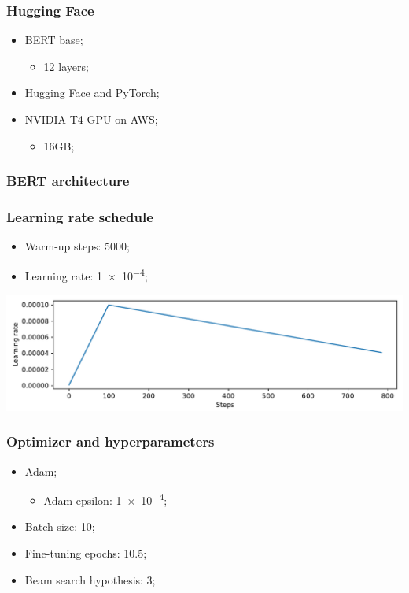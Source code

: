 \documentclass{beamer}
\begin{document}
\begin{frame}
  \frametitle{Hugging Face}

  \begin{itemize}
    \item BERT base;
          \begin{itemize}
            \item 12 layers;
          \end{itemize}
    \item Hugging Face and PyTorch;
    \item NVIDIA T4 GPU on AWS;
          \begin{itemize}
            \item \num{16}{GB};
          \end{itemize}
  \end{itemize}
\end{frame}

\begin{frame}
  \frametitle{BERT architecture}

\end{frame}

\begin{frame}
  \frametitle{Learning rate schedule}

  \begin{itemize}
    \item Warm-up steps: \num{5000};
    \item Learning rate: \num{1e-4};
  \end{itemize}

  \bigbreak
  \bigbreak

  \includegraphics[width=\textwidth]{../images/warmup_linear_schedule.pdf}
\end{frame}

\begin{frame}
  \frametitle{Optimizer and hyperparameters}

  \begin{itemize}
    \item Adam;
          \begin{itemize}
            \item Adam epsilon: \num{1e-4};
          \end{itemize}
    \item Batch size: \num{10};
    \item Fine-tuning epochs: \num{10.5};
    \item Beam search hypothesis: \num{3};
  \end{itemize}
\end{frame}
\end{document}

